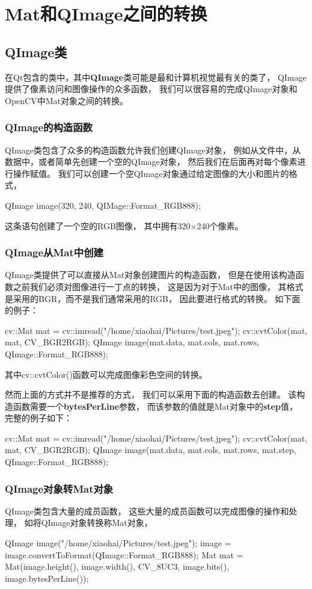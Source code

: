 \chapter{Mat和QImage之间的转换}
\section{QImage类}
在Qt包含的类中，其中\textbf{\color{magenta}QImage}类可能是最和计算机视觉最有关的类了，%
QImage提供了像素访问和图像操作的众多函数，%
我们可以很容易的完成QImage对象和OpenCV中Mat对象之间的转换。%

\subsection{QImage的构造函数}
QImage类包含了众多的构造函数允许我们创建QImage对象，%
例如从文件中，从数据中，或者简单先创建一个空的QImage对象，%
然后我们在后面再对每个像素进行操作赋值。%
我们可以创建一个空QImage对象通过给定图像的大小和图片的格式，%
\begin{cppcode}
  QImage image(320, 240, QIMage::Format_RGB888);
\end{cppcode}
这条语句创建了一个空的RGB图像，%
其中拥有320$\times$240个像素。

\subsection{QImage从Mat中创建}
QImage类提供了可以直接从Mat对象创建图片的构造函数，%
但是在使用该构造函数之前我们必须对图像进行一丁点的转换，%
这是因为对于Mat中的图像，%
其格式是采用的BGR，而不是我们通常采用的RGB，%
因此要进行格式的转换。%
如下面的例子：
\begin{cppcode}
  cv::Mat mat = cv::imread("/home/xiaohai/Pictures/test.jpeg");
  cv::cvtColor(mat, mat, CV_BGR2RGB);
  QImage image(mat.data, mat.cols, mat.rows, QImage::Format_RGB888);
\end{cppcode}
其中cv::cvtColor()函数可以完成图像彩色空间的转换。

然而上面的方式并不是推荐的方式，%
我们可以采用下面的构造函数去创建。%
该构造函数需要一个\textbf{\color{magenta}bytesPerLine}参数，%
而该参数的值就是Mat对象中的\textbf{\color{magenta}step}值，%
完整的例子如下：
\begin{cppcode}
  cv::Mat mat = cv::imread("/home/xiaohai/Pictures/test.jpeg");
  cv::cvtColor(mat, mat, CV_BGR2RGB);
  QImage image(mat.data, mat.cols, mat.rows, mat.step, QImage::Format_RGB888);
\end{cppcode}

\subsection{QImage对象转Mat对象}
QImage类包含大量的成员函数，%
这些大量的成员函数可以完成图像的操作和处理，%
如将QImage对象转换称Mat对象，
\begin{cppcode}
  QImage image("/home/xiaohai/Pictures/test.jpeg");
  image = image.convertToFormat(QImage::Format_RGB888);
  Mat mat = Mat(image.height(), image.width(), CV_8UC3, image.bits(), image.bytesPerLine());
\end{cppcode}



